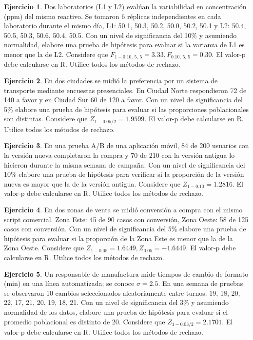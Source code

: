 \documentclass[
  11pt,
]{book}
\theoremstyle{definition}
\theoremstyle{definition}
\theoremstyle{definition}
\newtheorem{exercise}{Ejercicio}[chapter]
\theoremstyle{definition}
\theoremstyle{remark}
\begin{document}
\begin{exercise}
Dos laboratorios (L1 y L2) evalúan la variabilidad en concentración (ppm) del mismo reactivo. Se tomaron 6 réplicas independientes en cada laboratorio durante el mismo día, L1: 50.1, 50.3, 50.2, 50.0, 50.2, 50.1 y L2: 50.4, 50.5, 50.3, 50.6, 50.4, 50.5. Con un nivel de significancia del 10\% y asumiendo normalidad, elabore una prueba de hipótesis para evaluar si la varianza de L1 es menor que la de L2. Considere que \(F_{1-0.10,\,5,\,5}=3.33, F_{0.10,\,5,\,5}=0.30\). El valor-p debe calcularse en R. Utilice todos los métodos de rechazo.
\end{exercise}

\begin{exercise}
En dos ciudades se midió la preferencia por un sistema de transporte mediante encuestas presenciales. En Ciudad Norte respondieron 72 de 140 a favor y en Ciudad Sur 60 de 120 a favor. Con un nivel de significancia del 5\% elabore una prueba de hipótesis para evaluar si las proporciones poblacionales son distintas. Considere que \(Z_{1-0.05/2}=1.9599\). El valor-p debe calcularse en R. Utilice todos los métodos de rechazo.
\end{exercise}

\begin{exercise}
En una prueba A/B de una aplicación móvil, 84 de 200 usuarios con la versión nueva completaron la compra y 70 de 210 con la versión antigua lo hicieron durante la misma semana de campaña. Con un nivel de significancia del 10\% elabore una prueba de hipótesis para verificar si la proporción de la versión nueva es mayor que la de la versión antigua. Considere que \(Z_{1-0.10}=1.2816\). El valor-p debe calcularse en R. Utilice todos los métodos de rechazo.
\end{exercise}

\begin{exercise}
En dos zonas de venta se midió conversión a compra con el mismo script comercial. Zona Este: 45 de 90 casos con conversión, Zona Oeste: 58 de 125 casos con conversión. Con un nivel de significancia del 5\% elabore una prueba de hipótesis para evaluar si la proporción de la Zona Este es menor que la de la Zona Oeste. Considere que \(Z_{1-0.05}=1.6449, Z_{0.05}=-1.6449\). El valor-p debe calcularse en R. Utilice todos los métodos de rechazo.
\end{exercise}

\begin{exercise}
Un responsable de manufactura mide tiempos de cambio de formato (min) en una línea automatizada; se conoce \(\sigma=2.5\). En una semana de pruebas se observaron 10 cambios seleccionados aleatoriamente entre turnos: 19, 18, 20, 22, 17, 21, 20, 19, 18, 21. Con un nivel de significancia del 3\% y asumiendo normalidad de los datos, elabore una prueba de hipótesis para evaluar si el promedio poblacional es distinto de 20. Considere que \(Z_{1-0.03/2}=2.1701\). El valor-p debe calcularse en R. Utilice todos los métodos de rechazo.
\end{exercise}
\end{document}
